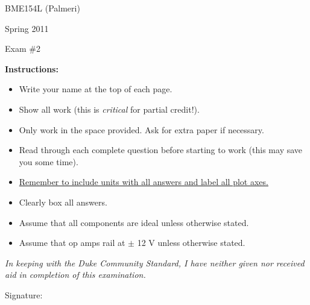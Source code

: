 

\vspace*{0.5in}

\centerline{\LARGE BME154L (Palmeri)}
\vspace*{0.25in}
\centerline{\LARGE Spring 2011}
\vspace*{0.25in}
\centerline{\LARGE Exam \#2}
\vspace*{0.25in}

{\bf Instructions:} 
\begin{itemize}
\item Write your name at the top of each page.
\item Show all work (this is {\it critical} for partial credit!).
\item Only work in the space provided.  Ask for extra paper if necessary.
\item Read through each complete question before starting to work (this may
save you some time).
\item \underline{Remember to include units with all answers and label all plot axes.}
\item Clearly box all answers.
\item Assume that all components are ideal unless otherwise stated.
\item Assume that op amps rail at $\pm$ 12 V unless otherwise stated.
\end{itemize}

\vspace*{2.0in}

\emph{In keeping with the Duke Community Standard, I have neither given nor received aid in completion of this examination.}

\vspace*{0.5in}

Signature:\underline{\hspace*{3.0in}}
